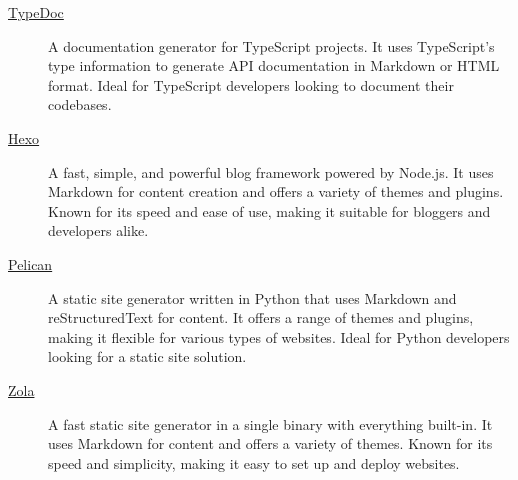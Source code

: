 \documentclass[a4paper,twoside]{article}
\begin{document}
\begin{description}
\item[{\href{https://typedoc.org/}{TypeDoc}}] A documentation generator for TypeScript projects. It uses TypeScript's type information to generate API documentation in Markdown or HTML format. Ideal for TypeScript developers looking to document their codebases.
\item[{\href{https://hexo.io/}{Hexo}}] A fast, simple, and powerful blog framework powered by Node.js. It uses Markdown for content creation and offers a variety of themes and plugins. Known for its speed and ease of use, making it suitable for bloggers and developers alike.
\item[{\href{https://blog.getpelican.com/}{Pelican}}] A static site generator written in Python that uses Markdown and reStructuredText for content. It offers a range of themes and plugins, making it flexible for various types of websites. Ideal for Python developers looking for a static site solution.
\item[{\href{https://www.getzola.org/}{Zola}}] A fast static site generator in a single binary with everything built-in. It uses Markdown for content and offers a variety of themes. Known for its speed and simplicity, making it easy to set up and deploy websites.
\end{description}
\end{document}
